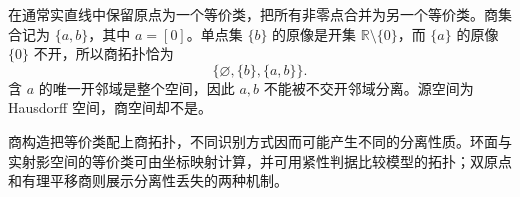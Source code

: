 \begin{example}\label{g1:exm:two-point-quotient}
	在通常实直线中保留原点为一个等价类，把所有非零点合并为另一个等价类。商集合记为 \(\{a,b\}\)，其中 \(a=[0]\)。单点集 \(\{b\}\) 的原像是开集 \(\mathbb R\setminus\{0\}\)，而 \(\{a\}\) 的原像 \(\{0\}\) 不开，所以商拓扑恰为
	\[
		\{\varnothing,\{b\},\{a,b\}\}.
	\]
	含 \(a\) 的唯一开邻域是整个空间，因此 \(a,b\) 不能被不交开邻域分离。源空间为 Hausdorff 空间，商空间却不是。
\end{example}

商构造把等价类配上商拓扑，不同识别方式因而可能产生不同的分离性质。环面与实射影空间的等价类可由坐标映射计算，并可用紧性判据比较模型的拓扑；双原点和有理平移商则展示分离性丢失的两种机制。
